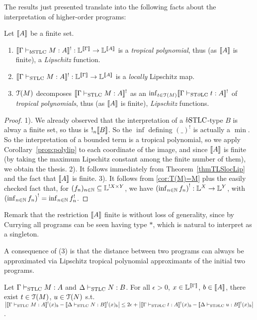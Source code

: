 The results just presented translate into the following facts about the interpretation of higher-order programs:

\begin{corollary}
Let $\llbracket A\rrbracket$ be a finite set.
\begin{enumerate}
\item $\model{\Gamma \vdash_{\BSTLC} M:A}^!:\Lawv^{\model\Gamma} \to \Lawv^{\model A}$ is a \emph{tropical polynomial}, thus (as $\llbracket A\rrbracket$ is finite), a \emph{Lipschitz} function.
\item $\llbracket\Gamma \vdash_{\mathrm{STLC}} M:A\rrbracket^!:\mathbb{L}^{\llbracket\Gamma\rrbracket} \to \mathbb{L}^{\llbracket A\rrbracket}$ is a \emph{locally} Lipschitz map.
\item $\mathcal{T}(M)$ decomposes $\llbracket\Gamma \vdash_{\mathrm{STLC}} M:A\rrbracket^!$ as an $\inf_{t\in\mathcal{T}(M)}\llbracket\Gamma\vdash_{\mathrm{ST}\partial\mathrm{LC}} t:A\rrbracket^!$ of \emph{tropical polynomials}, thus (as $\llbracket A\rrbracket$ is finite), \emph{Lipschitz} functions.
\end{enumerate}
\end{corollary} 
\begin{proof}
1). We already observed that the interpretation of a $\BSTLC$-type $B$ is alway a finite set, so thus is $!_n \llbracket B\rrbracket$.
So the $\inf$ defining $(\_)^!$ is actually a $\min$.
So the interpretation of a bounded term is a tropical polynomial, so we apply Corollary~\ref{prop:polylip} to each coordinate of the image, and since $\llbracket A\rrbracket$ is finite (by taking the maximum Lipschitz constant among the finite number of them), we obtain the thesis.
2). It follows immediately from Theorem~\ref{thmTLSlocLip} and the fact that $\llbracket A\rrbracket$ is finite.
3). It follows from \autoref{cor:T(M)=M} plus the easily checked fact that, for $(f_n)_{n\in\mathbb{N}}\subseteq\mathbb{L}^{!X\times Y}$, we have $\left(\inf_{n\in\mathbb{N}} f_n\right)^!:\mathbb{L}^X\to\mathbb{L}^Y$, with $\left(\inf_{n\in\mathbb{N}} f_n\right)^!=\inf_{n\in\mathbb{N}} f_n^!$.
\end{proof}

Remark that the restriction $\llbracket A\rrbracket$ finite is without loss of generality, since by Currying all programs can be seen having type $*$, which is natural to interpret as a singleton.

A consequence of (3) is that the distance between two programs can always be approximated via Lipschitz tropical polynomial approximants of the initial two programs.
\begin{corollary}
 Let $\Gamma \vdash_{\mathrm{STLC}} M:A$ and $\Delta\vdash_{\mathrm{STLC}} N:B$.
 For all $\epsilon>0$, $x\in\mathbb{L}^{\llbracket\Gamma\rrbracket}$, $b\in\llbracket A\rrbracket$, there exist $t\in\mathcal{T}(M)$, $u\in\mathcal{T}(N)$ s.t.\ $\big| \llbracket\Gamma \vdash_{\mathrm{STLC}} M:A\rrbracket^!(x)_b - \llbracket\Delta \vdash_{\mathrm{STLC}} N:B\rrbracket^!(x)_b \big| \leq 2\epsilon + \big| \llbracket\Gamma \vdash_{\mathrm{ST}\partial\mathrm{LC}} t:A\rrbracket^!(x)_b - \llbracket\Delta \vdash_{\mathrm{ST}\partial\mathrm{LC}} u:B\rrbracket^!(x)_b \big|$.
\end{corollary}

